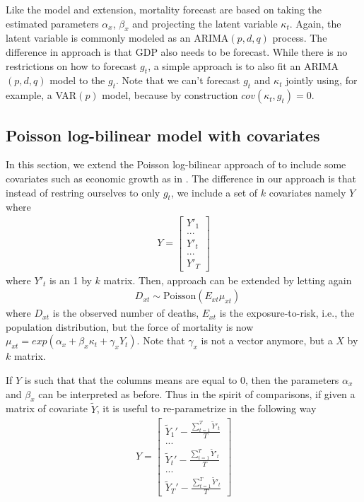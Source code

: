\documentclass[AER, draftmode]{AEA}
\begin{document}
Like the \cite{Lee1992} model and \cite{Brouhns2002} extension, mortality forecast are based on taking the estimated parameters $\alpha_x$, $\beta_x$ and projecting the latent variable $\kappa_t$. Again, the latent variable is commonly modeled as an ARIMA$(p,d,q)$ process. The difference in \cite{Niu2014} approach is that GDP also needs to be forecast. While there is no restrictions on how to forecast $g_t$, a simple approach is to also fit an ARIMA$(p,d,q)$ model to the $g_t$. Note that we can't forecast $g_t$ and $\kappa_t$ jointly using, for example, a VAR$(p)$ model, because by construction $cov(\kappa_t, g_t) = 0$.

\subsection{Poisson log-bilinear model with covariates} \label{model}

In this section, we extend the Poisson log-bilinear approach of \cite{Brouhns2002} to include some covariates such as economic growth as in \cite{Niu2014}. The difference in our approach is that instead of restring ourselves to only $g_t$, we include a set of $k$ covariates namely $Y$ where
\begin{align}
	Y = \begin{bmatrix}
	Y'_1 \\
	... \\
	Y'_t \\
	... \\
	Y'_T
	\end{bmatrix}
\end{align}
where $Y'_t$ is an 1 by $k$ matrix. Then, \cite{Brouhns2002} approach can be extended by letting again
\begin{align}
&D_{xt}\sim\text{Poisson}(E_{xt}\mu_{xt})
\end{align}
where $D_{xt}$ is the observed number of deaths, $E_{xt}$ is the exposure-to-risk, i.e., the population distribution, but the force of mortality is now $\mu_{xt}=exp(\alpha_x+\beta_x \kappa_t + \gamma_x Y_t)$. 
Note that $\gamma_x$ is not a vector anymore, but a $X$ by $k$ matrix.

If $Y$ is such that that the columns means are equal to $0$, then the parameters $\alpha_x$ and $\beta_x$ can be interpreted as before. Thus in the spirit of comparisons, if given a matrix of covariate $\tilde{Y}$, it is useful to re-parametrize in the following way
\begin{align}
Y = \begin{bmatrix}
\tilde{Y}_1' - \frac{\sum_{t=1}^{T} \tilde{Y}'_t}{T} \\
... \\
\tilde{Y}_t' - \frac{\sum_{t=1}^{T} \tilde{Y}'_t}{T} \\
... \\
\tilde{Y}_T' - \frac{\sum_{t=1}^{T} \tilde{Y}'_t}{T}
\end{bmatrix}
\end{align}
\end{document}
